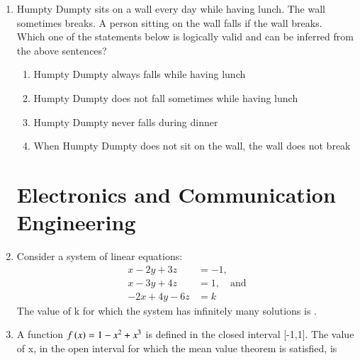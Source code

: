 \documentclass[a4paper, 11pt]{article}
\begin{document}
\begin{enumerate}
    \hfill{}

    \item Humpty Dumpty sits on a wall every day while having lunch. The wall sometimes breaks. A person sitting on the wall falls if the wall breaks.\\Which one of the statements below is logically valid and can be inferred from the above sentences?
    \begin{enumerate}
        \item Humpty Dumpty always falls while having lunch
        \item Humpty Dumpty does not fall sometimes while having lunch
        \item Humpty Dumpty never falls during dinner
        \item When Humpty Dumpty does not sit on the wall, the wall does not break
    \end{enumerate}
    
    \hfill{}
\section*{Electronics and Communication Engineering }
    \item Consider a system of linear equations:
    \begin{align*}
        x-2y+3z &= -1, \\
        x-3y+4z &= 1, \quad \text{and} \\
        -2x+4y-6z &= k
    \end{align*}
    The value of k for which the system has infinitely many solutions is \underline{\hspace{2cm}}.
    
    \hfill{}

    \item A function $f\left(x\right)=1-x^{2}+x^{3}$ is defined in the closed interval [-1,1]. The value of x, in the open interval  for which the mean value theorem is satisfied, is
    \begin{enumerate}
    \end{enumerate}
    

\end{enumerate}
\end{document}

